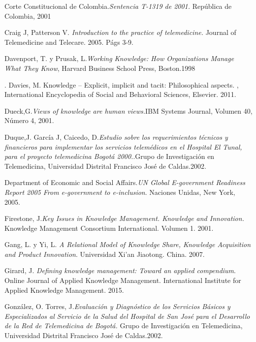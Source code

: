 \begin{thebibliography}{}
 Corte Constitucional de Colombia.\textit{Sentencia T-1319 de 2001.} República de Colombia, 2001

 Craig J, Patterson V. \textit{Introduction to the practice of telemedicine.} Journal of Telemedicine and Telecare. 2005. Págs 3-9.

 Davenport, T. y Prusak, L.\textit{Working Knowledge: How Organizations Manage What They Know}, Harvard Business School Press, Boston.1998

. Davies, M. Knowledge – Explicit, implicit and tacit: Philosophical aspects. , International Encyclopedia of Social and Behavioral Sciences, Elsevier. 2011.

 Dueck,G.\textit{Views of knowledge are human views.}IBM Systems Journal, Volumen 40, Número 4, 2001.

 Duque,J. García J, Caicedo, D.\textit{Estudio sobre los requerimientos técnicos y financieros para implementar los servicios telemédicos en el Hospital El Tunal,  para el proyecto telemedicina Bogotá 2000.}.Grupo de Investigación en Telemedicina,  Universidad Distrital Francisco José de Caldas.2002.

 Department of Economic and Social Affairs.\textit{UN Global E-government Readiness Report 2005 From e-government to e-inclusion}. Naciones Unidas, New York, 2005.

 Firestone, J.\textit{Key Issues in Knowledge Management. Knowledge and Innovation.} Knowledge Management Consortium International. Volumen 1. 2001.

 Gang, L. y Yi, L. \textit{A Relational Model of Knowledge Share, Knowledge Acquisition and Product Innovation}. Universidad Xi'an Jiaotong. China. 2007.

 Girard, J. \textit{Defining knowledge management: Toward an applied compendium}. Online Journal of Applied Knowledge Management. International Institute for Applied Knowledge Management. 2015.

 González, O. Torres, J.\textit{Evaluación y Diagnóstico de los Servicios Básicos y Especializados al Servicio de la Salud del Hospital de San José para el Desarrollo de la Red de Telemedicina de Bogotá.} Grupo de Investigación en Telemedicina, Universidad Distrital Francisco José de Caldas.2002.


\end{thebibliography}
